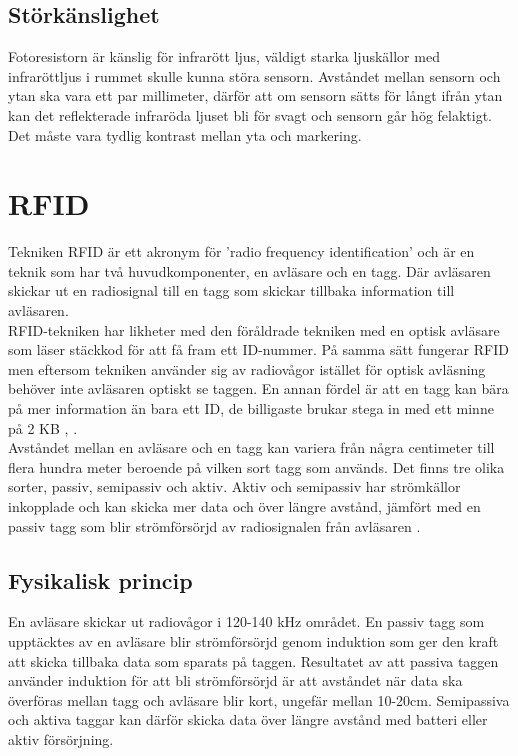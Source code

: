 \documentclass[11pt]{article}
\begin{document}
\begin{flushleft}
\subsection{Störkänslighet}
Fotoresistorn är känslig för infrarött ljus, väldigt starka ljuskällor med infraröttljus i rummet skulle kunna störa sensorn. Avståndet mellan sensorn och ytan ska vara ett par millimeter, därför att om sensorn sätts för långt ifrån ytan kan det reflekterade infraröda ljuset bli för svagt och sensorn går hög felaktigt. Det måste vara tydlig kontrast mellan yta och markering.

\pagebreak
 
\section{RFID}
Tekniken RFID är ett akronym för 'radio frequency identification' och är en teknik som har två huvudkomponenter, en avläsare och en tagg. Där avläsaren skickar ut en radiosignal till en tagg som skickar tillbaka information till avläsaren.
\\[0.1in]

RFID-tekniken har likheter med den föråldrade tekniken med en optisk avläsare som läser stäckkod för att få fram ett ID-nummer. På samma sätt fungerar RFID men eftersom tekniken använder sig av radiovågor istället för optisk avläsning behöver inte avläsaren optiskt se taggen. En annan fördel är att en tagg kan bära på mer information än bara ett ID, de billigaste brukar stega in med ett minne på 2 KB \autocite{rfid1}, \autocite{rfid_faq}.    
\\[0.1in]

Avståndet mellan en avläsare och en tagg kan variera från några centimeter till flera hundra meter beroende på vilken sort tagg som används. Det finns tre olika sorter, passiv, semipassiv och aktiv. Aktiv och semipassiv har strömkällor inkopplade och kan skicka mer data och över längre avstånd, jämfört med en passiv tagg som blir strömförsörjd av radiosignalen från avläsaren \autocite{Weis_rfid}. 
\\[0.1in]

 \subsection{Fysikalisk princip}
En avläsare skickar ut radiovågor i 120-140 kHz området. En passiv tagg som upptäcktes av en avläsare blir strömförsörjd genom induktion som ger den kraft att skicka tillbaka data som sparats på taggen. Resultatet av att passiva taggen använder induktion för att bli strömförsörjd är att avståndet när data ska överföras mellan tagg och avläsare blir kort, ungefär mellan 10-20cm. Semipassiva och aktiva taggar kan därför skicka data över längre avstånd med batteri eller aktiv försörjning.  


\end{flushleft}
\end{document}
